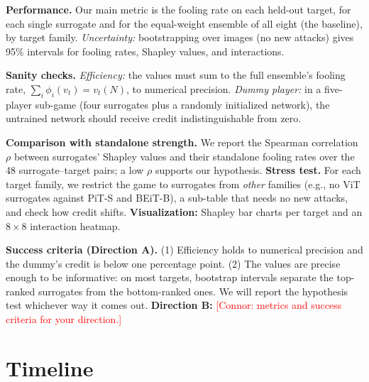 \documentclass{article}
\newcommand{\connor}[1]{\textcolor{red}{[Connor: #1]}}
\begin{document}
\textbf{Performance.} Our main metric is the fooling rate on each held-out target, for each single surrogate and for the equal-weight ensemble of all eight (the baseline), by target family. \emph{Uncertainty:} bootstrapping over images (no new attacks) gives 95\% intervals for fooling rates, Shapley values, and interactions.

\textbf{Sanity checks.} \emph{Efficiency:} the values must sum to the full ensemble's fooling rate, $\sum_i\phi_i(v_t)=v_t(N)$, to numerical precision. \emph{Dummy player:} in a five-player sub-game (four surrogates plus a randomly initialized network), the untrained network should receive credit indistinguishable from zero.

\textbf{Comparison with standalone strength.} We report the Spearman correlation $\rho$ between surrogates' Shapley values and their standalone fooling rates over the 48 surrogate--target pairs; a low $\rho$ supports our hypothesis. \textbf{Stress test.} For each target family, we restrict the game to surrogates from \emph{other} families (e.g., no ViT surrogates against PiT-S and BEiT-B), a sub-table that needs no new attacks, and check how credit shifts. \textbf{Visualization:} Shapley bar charts per target and an $8\times8$ interaction heatmap.

\textbf{Success criteria (Direction A).} (1) Efficiency holds to numerical precision and the dummy's credit is below one percentage point. (2) The values are precise enough to be informative: on most targets, bootstrap intervals separate the top-ranked surrogates from the bottom-ranked ones. We will report the hypothesis test whichever way it comes out. \textbf{Direction B:} \connor{metrics and success criteria for your direction.}

\section{Timeline}
\end{document}
